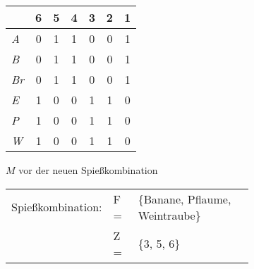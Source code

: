 \begin{figure}[H]
\vspace{-0.7cm}
\caption{Beide Abbildungen stellen die Adjazenzmatrix für das Beispiel aus der Aufgabenstellung dar.
Die Buchstaben in der ersten Spalte stehen für die entsprechenden Obstsorten
und die Zahlen in der ersten Zeile stehen für die Indizes aus demselben Beispiel (s. auch \ref{example:0}).\\
Auf der Abb. \ref{fig:matrix-danach} stehen $bn$ und $br$ für die entsprechenden Bitmasken.}
\begin{subfigure}[b]{.39\textwidth}
\centering
\begin{tabular}{>{\itshape}l|c|c|c|c|c|c|}
 & 6 & 5 & 4 & 3 & 2 & 1 \\ \hline
A & 0 & 1 & 1 &0 & 0 & 1 \\ \hline 
B & 0 & 1 & 1 &0 & 0 & 1 \\ \hline 
Br & 0 & 1 & 1 &0 & 0 & 1 \\ \hline 
E & 1 & 0 & 0 & 1 & 1 & 0 \\ \hline 
P & 1 & 0 & 0 & 1 & 1 & 0 \\ \hline 
W & 1 & 0 & 0 & 1 & 1 & 0 \\ \hline 
\end{tabular}
\caption{$M$ vor der neuen Spießkombination}
\label{fig:matrix-anfang}
\end{subfigure}
\begin{subfigure}[b]{.59\textwidth}
\vspace{0.25cm}
\begin{tabular}{lll}
Spießkombination: & F =&\{Banane, Pflaume, Weintraube\} \\
 & Z =&\{3, 5, 6\} \\
\end{tabular}\\
\centering


\end{subfigure}
\end{figure}

